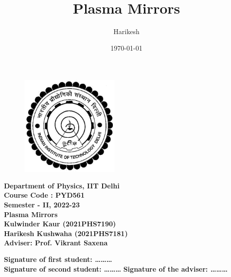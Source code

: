 \documentclass[12pt]{article}
\title{Plasma Mirrors}
\author{Harikesh}
\date{\today}
\newenvironment{changemargin}[2]{
\begin{list}{}{
\setlength{\topsep}{0pt}
\setlength{\leftmargin}{#1}
\setlength{\rightmargin}{#2}
\setlength{\listparindent}{\parindent}
\setlength{\itemindent}{\parindent}
\setlength{\parsep}{\parskip}
}
\item[]}{\end{list}}
\begin{document}
\begin{titlepage}
    \begin{figure}
        \includegraphics[width=5cm, height=5cm]{logo.png}
        \centering
    \end{figure}
    \begin{center}
        \textbf{\Large{Department of Physics, IIT Delhi}}\\
        \vspace*{1cm}
        \textbf{\Large{Course Code : PYD561}}\\
        \vspace*{0.2cm}
        \textbf{\Large {Semester - II, 2022-23}}\\
        \vspace*{1cm}
        \textbf{\LARGE{Plasma Mirrors}}\\
        \vspace*{1cm}
        \textbf{\Large{Kulwinder Kaur (2021PHS7190)}}\\
        \vspace*{0.2cm}
        \textbf{\Large {Harikesh Kushwaha (2021PHS7181)}}\\
        \vspace*{1cm}
        \textbf{\Large {Adviser: Prof. Vikrant Saxena}}\\
        \vspace*{2cm}
    \end{center}
    \begin{flushleft}


        \textbf{Signature of first student: \ldots \ldots \ldots}\\
        \vspace*{1cm}
        \textbf{Signature of second student: \ldots \ldots \ldots}
        \hspace*{2cm}
        \textbf{Signature of the adviser: \ldots \ldots \ldots}
    \end{flushleft}
\end{titlepage}
\newpage
\end{document}

